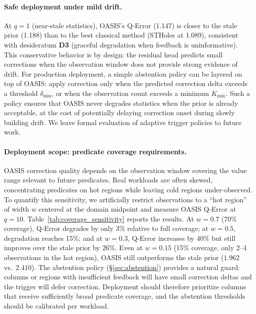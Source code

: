 \documentclass[runningheads]{llncs}
\begin{document}
\paragraph{Safe deployment under mild drift.}
At $q{=}1$ (near-stale statistics), OASIS's Q-Error (1.147) is closer to the stale prior (1.188) than to the best classical method (STHoles at 1.089), consistent with desideratum \textbf{D3} (graceful degradation when feedback is uninformative). This conservative behavior is by design: the residual head predicts small corrections when the observation window does not provide strong evidence of drift. For production deployment, a simple abstention policy can be layered on top of OASIS: apply correction only when the predicted correction delta exceeds a threshold $\delta_{\min}$, or when the observation count exceeds a minimum $K_{\min}$. Such a policy ensures that OASIS never degrades statistics when the prior is already acceptable, at the cost of potentially delaying correction onset during slowly building drift. We leave formal evaluation of adaptive trigger policies to future work.

\paragraph{Deployment scope: predicate coverage requirements.}
OASIS correction quality depends on the observation window covering the value range relevant to future predicates. Real workloads are often skewed, concentrating predicates on hot regions while leaving cold regions under-observed. To quantify this sensitivity, we artificially restrict observations to a ``hot region'' of width $w$ centered at the domain midpoint and measure OASIS Q-Error at $q{=}10$. Table~\ref{tab:coverage_sensitivity} reports the results. At $w{=}0.7$ (70\% coverage), Q-Error degrades by only 3\% relative to full coverage; at $w{=}0.5$, degradation reaches 15\%; and at $w{=}0.3$, Q-Error increases by 40\% but still improves over the stale prior by 26\%. Even at $w{=}0.15$ (15\% coverage, only 2--4 observations in the hot region), OASIS still outperforms the stale prior ($1.962$ vs.\ $2.410$). The abstention policy (\S\ref{sec:abstention}) provides a natural guard: columns or regions with insufficient feedback will have small correction deltas and the trigger will defer correction. Deployment should therefore prioritize columns that receive sufficiently broad predicate coverage, and the abstention thresholds should be calibrated per workload.
\end{document}

